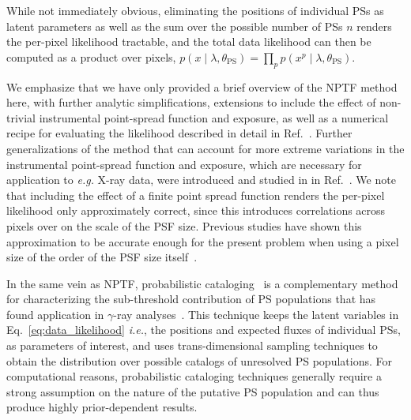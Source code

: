 \documentclass[prd,aps,10pt,nofootinbib,twocolumn,superscriptaddress,preprintnumbers,balancelastpage,longbibliography]{revtex4-1}
\begin{document}
While not immediately obvious, eliminating the positions of individual PSs as latent parameters as well as the sum over the possible number of PSs $n$ renders the per-pixel likelihood tractable, and the total data likelihood can then be computed as a product over pixels, $p(x\mid\lambda,\theta_\mathrm{PS}) = \prod_{p} p(x^p\mid\lambda,\theta_\mathrm{PS})$.

We emphasize that we have only provided a brief overview of the NPTF method here, with further analytic simplifications, extensions to include the effect of non-trivial instrumental point-spread function and exposure, as well as a numerical recipe for evaluating the likelihood described in detail in Ref.~\cite{Mishra-Sharma:2016gis}. Further generalizations of the method that can account for more extreme variations in the instrumental point-spread function and exposure, which are necessary for application to \emph{e.g.} X-ray data, were introduced and studied in in Ref.~\cite{Collin:2021ufc}. We note that including the effect of a finite point spread function renders the per-pixel likelihood only approximately correct, since this introduces correlations across pixels over on the scale of the PSF size. Previous studies have shown this approximation to be accurate enough for the present problem when using a pixel size of the order of the PSF size itself~\cite{Chang:2019ars}. 

In the same vein as NPTF, probabilistic cataloging~\cite{2013AJ....146....7B,2021arXiv210202409L} is a complementary method for characterizing the sub-threshold contribution of PS populations that has found application in $\gamma$-ray analyses~\cite{Daylan:2016tia}. This technique keeps the latent variables in Eq.~\eqref{eq:data_likelihood} \emph{i.e.}, the positions and expected fluxes of individual PSs, as parameters of interest, and uses trans-dimensional sampling techniques to obtain the distribution over possible catalogs of unresolved PS populations. For computational reasons, probabilistic cataloging techniques generally require a strong assumption on the nature of the putative PS population and can thus produce highly prior-dependent results.

\end{document}
